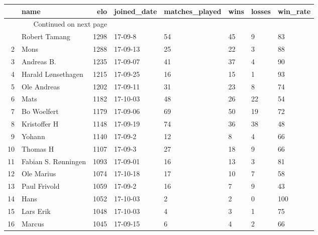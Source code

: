 \begin{longtable}{|r|l|r|l|l|l|l|l|}
\toprule
{} &                 name &   elo & joined\_date &  matches\_played &  wins &  losses &  win\_rate \\
\midrule
\endhead
\midrule
\multicolumn{3}{r}{{Continued on next page}} \\
\midrule
\endfoot

\bottomrule
\endlastfoot
1  &        Robert Tamang &  1298 &     17-09-8 &              54 &    45 &       9 &        83 \\
2  &                 Mons &  1288 &    17-09-13 &              25 &    22 &       3 &        88 \\
3  &           Andreas B. &  1235 &    17-09-07 &              41 &    37 &       4 &        90 \\
4  &   Harald Lønsethagen &  1215 &    17-09-25 &              16 &    15 &       1 &        93 \\
5  &          Ole Andreas &  1202 &    17-09-11 &              31 &    23 &       8 &        74 \\
6  &                 Mats &  1182 &    17-10-03 &              48 &    26 &      22 &        54 \\
7  &          Bo Woelfert &  1179 &    17-09-06 &              69 &    50 &      19 &        72 \\
8  &         Kristoffer H &  1148 &    17-09-19 &              74 &    36 &      38 &        48 \\
9  &               Yohann &  1140 &     17-09-2 &              12 &     8 &       4 &        66 \\
10 &             Thomas H &  1107 &     17-09-3 &              27 &    18 &       9 &        66 \\
11 &  Fabian S. Rønningen &  1093 &    17-09-01 &              16 &    13 &       3 &        81 \\
12 &           Ole Marius &  1074 &    17-10-18 &              17 &    10 &       7 &        58 \\
13 &         Paul Frivold &  1059 &     17-09-2 &              16 &     7 &       9 &        43 \\
14 &                 Hans &  1052 &    17-10-03 &               2 &     2 &       0 &       100 \\
15 &            Lars Erik &  1048 &    17-10-03 &               4 &     3 &       1 &        75 \\
16 &               Marcus &  1045 &    17-09-15 &               6 &     4 &       2 &        66 \\

\end{longtable}
